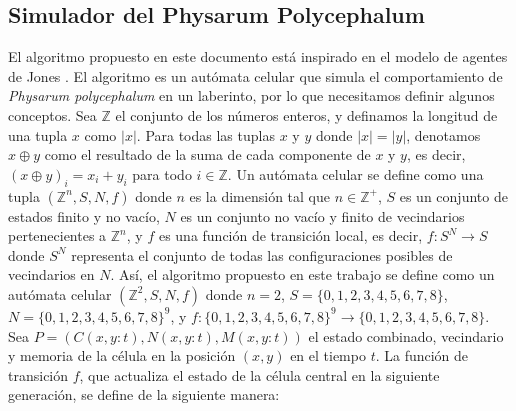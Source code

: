 \subsection{Simulador del Physarum Polycephalum} %
\label{sub:subsection name}

    El algoritmo propuesto en este documento est\'a inspirado en el modelo de agentes de Jones \cite{Jones2015}. 
    El algoritmo es un aut\'omata celular que simula el comportamiento de \textit{Physarum polycephalum} en un laberinto, 
    por lo que necesitamos definir algunos conceptos. Sea $\mathbb{Z}$ el conjunto de los n\'umeros enteros, y definamos la 
    longitud de una tupla $x$ como $|x|$. Para todas las tuplas $x$ y $y$ donde $|x| = |y|$, denotamos $x \oplus y$ como 
    el resultado de la suma de cada componente de $x$ y $y$, es decir, $(x \oplus y)_i = x_i + y_i$ para todo $i \in \mathbb{Z}$.
    \vskip 0.5cm
    Un aut\'omata celular se define como una tupla $(\mathbb{Z}^{n}, S, N, f)$ donde $n$ es la dimensi\'on tal 
    que $n \in \mathbb{Z}^{+}$, $S$ es un conjunto de estados finito y no vac\'io, $N$ es un conjunto no vac\'io y 
    finito de vecindarios pertenecientes a $\mathbb{Z}^{n}$, y $f$ es una funci\'on de transici\'on local, es decir, 
    $f: S^N \rightarrow S$ donde $S^N$ representa el conjunto de todas las configuraciones posibles de vecindarios en $N$.
    \vskip 0.5cm
    As\'i, el algoritmo propuesto en este trabajo se define como un aut\'omata celular $(\mathbb{Z}^{2}, S, N, f)$ 
    donde $n = 2$, $S = \{0, 1, 2, 3, 4, 5, 6, 7, 8\}$, $N = \{0, 1, 2, 3, 4, 5, 6, 7, 8\}^9$, y $f : \{0, 1, 2, 3, 4, 5, 6, 7, 8\}^9 
    \rightarrow \{0, 1, 2, 3, 4, 5, 6, 7, 8\}$.
    \vskip 0.5cm
    Sea \( P = (C(x,y:t), N(x,y:t), M(x,y:t)) \) el estado combinado, vecindario y memoria de la c\'elula 
    en la posici\'on \((x, y)\) en el tiempo \( t \). La funci\'on de transici\'on \( f \), que actualiza el 
    estado de la c\'elula central en la siguiente generaci\'on, se define de la siguiente manera:
    
